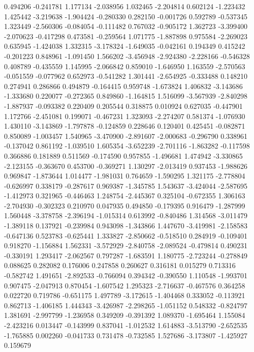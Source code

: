 0.494206
-0.241781
1.177134
-2.038956
1.032465
-2.204814
0.602124
-1.223432
1.425442
-3.219638
-1.904424
-0.280330
0.282150
-0.001726
0.592789
-0.537345
1.323449
-2.560306
-0.084054
-0.111482
0.767032
-0.905172
1.362723
-3.399400
-2.070623
-0.417298
0.473581
-0.259564
1.071775
-1.887898
0.975584
-2.269023
0.635945
-1.424038
1.332315
-3.178324
-1.649035
-0.042161
0.194349
0.415242
-0.201223
0.848961
-1.091450
1.566202
-3.456948
-2.924380
-2.228166
-0.546328
0.408789
-0.435559
1.145995
-2.066842
0.859010
-1.646950
1.163559
-2.570563
-0.051559
-0.077962
0.652973
-0.541282
1.301441
-2.654925
-0.333488
0.148210
0.274941
0.286866
0.494879
-0.164415
0.959748
-1.673824
1.406832
-3.143686
-1.333680
0.220077
-0.272365
0.849860
-1.164815
1.516099
-3.567939
-2.840298
-1.887937
-0.093382
0.220409
0.205544
0.318875
0.010924
0.627035
-0.447901
1.172766
-2.451081
0.199071
-0.467231
1.323093
-2.274207
0.581374
-1.076930
1.430110
-3.143869
-1.797878
-0.124859
0.228646
0.120401
0.425451
-0.082871
0.850089
-1.003457
1.540965
-3.470900
-2.891607
-2.000683
-0.296790
0.338961
-0.137042
0.861192
-1.039510
1.605354
-3.652239
-2.701116
-1.863282
-0.117598
0.366886
0.181889
0.511569
-0.174590
0.957855
-1.496681
1.474942
-3.330865
-2.123155
-0.363670
0.453700
-0.369271
1.130297
-2.013419
0.937453
-1.988626
0.969847
-1.873644
1.014477
-1.981031
0.764659
-1.590295
1.321175
-2.778804
-0.626997
0.338179
-0.287617
0.969387
-1.345785
1.543637
-3.424044
-2.587695
-1.412973
0.321965
-0.446463
1.248754
-2.445367
0.325104
-0.672355
1.306163
-2.704930
-0.302323
0.210970
0.047935
0.494850
-0.179395
0.916479
-1.287999
1.560448
-3.378758
-2.396194
-1.015314
0.613992
-0.840486
1.314568
-3.011479
-1.389118
0.137921
-0.239984
0.943098
-1.343866
1.447670
-3.419981
-2.158583
-0.647136
0.523783
-0.625441
1.333827
-2.850662
-0.518510
0.284919
-0.109401
0.918270
-1.156884
1.562331
-3.572929
-2.840758
-2.089524
-0.479814
0.490231
-0.330191
1.293417
-2.062567
0.797287
-1.683591
1.180775
-2.723244
-0.278849
0.088625
0.282082
0.176006
0.247858
0.260627
0.316181
0.015279
0.713316
-0.582742
1.491651
-2.892533
-0.766094
0.394342
-0.390550
1.110548
-1.993701
0.907475
-2.047913
0.870454
-1.607542
1.295323
-2.716637
-0.467576
0.364258
0.022720
0.719786
-0.651175
1.497789
-3.172615
-1.404468
0.333052
-0.113921
0.862713
-1.406185
1.444343
-3.426987
-2.298265
-1.051152
0.548332
-0.824797
1.381691
-2.997799
-1.236958
0.349209
-0.391392
1.089370
-1.695464
1.155084
-2.423216
0.013447
-0.143999
0.837041
-1.012532
1.614883
-3.513790
-2.652535
-1.765885
0.002260
-0.041733
0.731478
-0.732585
1.527686
-3.173807
-1.425927
0.159679
